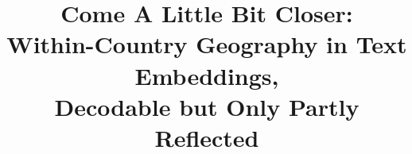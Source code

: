 \documentclass[10pt]{article}
\title{Come A Little Bit Closer:\\Within-Country Geography in Text Embeddings,\\Decodable but Only Partly Reflected}
\begin{document}
\maketitle







\label{end-of-body}


\end{document}
